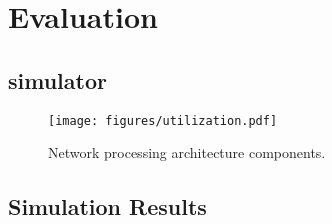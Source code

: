 \section{Evaluation}
\label{sec:evaluation}

\subsection{simulator}

\begin{figure}[t]
\begin{center}
\texttt{[image: figures/utilization.pdf]}  
\caption{Network processing architecture components.}
\label{fig:architecture}
\end{center}
\vspace{-7mm}
\end{figure}



\subsection{Simulation Results}

